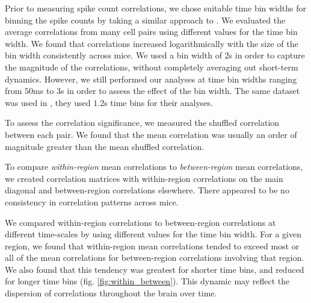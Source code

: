 \documentclass[a4paper,12pt]{article}
\theoremstyle{definition}
\begin{document}
Prior to measuring spike count correlations, we chose suitable time bin widths for binning the spike counts by taking a similar approach to \cite{cohen2}. We evaluated the average correlations from many cell pairs using different values for the time bin width. We found that correlations increased logarithmically with the size of the bin width consistently across mice. We used a bin width of $2$s in order to capture the magnitude of the correlations, without completely averaging out short-term dynamics. However, we still performed our analyses at time bin widths ranging from $50$ms to $3$s in order to assess the effect of the bin width. The same dataset was used in \cite{stringer}, they used $1.2$s time bins for their analyses.

To assess the correlation significance, we measured the shuffled correlation between each pair. We found that the mean correlation was usually an order of magnitude greater than the mean shuffled correlation. 


To compare \textit{within-region} mean correlations to \textit{between-region} mean correlations, we created correlation matrices with within-region correlations on the main diagonal and between-region correlations elsewhere. There appeared to be no consistency in correlation patterns across mice. %


We compared within-region correlations to between-region correlations at different time-scales by using different values for the time bin width. For a given region, we found that within-region mean correlations tended to exceed most or all of the mean correlations for between-region correlations involving that region. We also found that this tendency was greatest for shorter time bins, and reduced for longer time bins (fig. \ref{fig:within_between}). This dynamic may reflect the dispersion of correlations throughout the brain over time.
\end{document}
